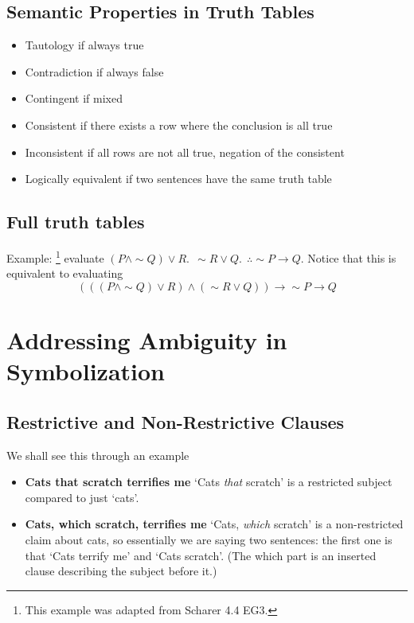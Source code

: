 \documentclass[10pt]{article}
\renewcommand{\implies}{\rightarrow}
\renewcommand{\neg}{\sim}
\begin{document}
\subsection{Semantic Properties in Truth Tables}
\begin{itemize}
    \item Tautology if always true
    \item Contradiction if always false 
    \item Contingent if mixed
    \item Consistent if there exists a row where the conclusion is all true
    \item Inconsistent if all rows are not all true, negation of the consistent
    \item Logically equivalent if two sentences have the same truth table
\end{itemize}



\subsection{Full truth tables}
Example: \footnote{This example was adapted from Scharer 4.4 EG3.}
evaluate $(P\land \neg Q)\vee R. ~~\neg R\vee Q. ~~\therefore \neg P\implies Q$. 
Notice that this is equivalent to evaluating
\begin{equation*}
    \left(\left(\left(P\land \neg Q\right)\vee R \right) \land 
    \left(\neg R\vee Q\right)\right) \implies \neg P\implies Q
\end{equation*}


\section{Addressing Ambiguity in Symbolization}
\subsection{Restrictive and Non-Restrictive Clauses}
We shall see this through an example
\begin{itemize}
    \item \textbf{Cats that scratch terrifies me} `Cats \textit{that} scratch' 
    is a restricted subject compared to just `cats'.
    \item \textbf{Cats, which scratch, terrifies me} `Cats, \textit{which} scratch'
    is a non-restricted claim about cats, so essentially we are saying two sentences:
    the first one is that `Cats terrify me' and `Cats scratch'. (The which part 
    is an inserted clause describing the subject before it.)
\end{itemize}
\end{document}
